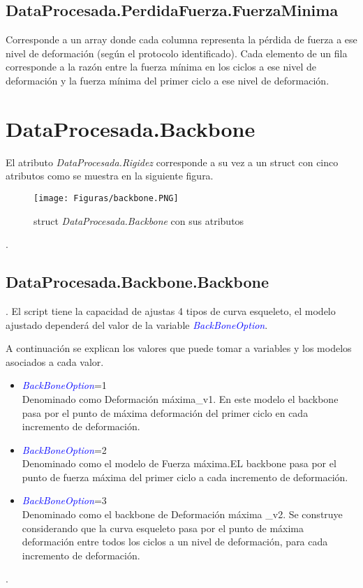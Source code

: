\documentclass[a4paper, 11pt,article,oneside]{memoir}%
\begin{document}
\section{DataProcesada.PerdidaFuerza.FuerzaMinima}
Corresponde a un array donde cada columna representa la pérdida de fuerza a ese nivel de deformación (según el protocolo identificado). Cada elemento de un fila corresponde a la razón entre la fuerza mínima en los ciclos a ese nivel de deformación y la fuerza mínima del primer ciclo a ese nivel de deformación.
\newpage
\chapter{DataProcesada.Backbone}
El atributo \textit{DataProcesada.Rigidez} corresponde a su vez a un struct con cinco atributos como se muestra en la siguiente figura.\par
\begin{figure}[h!]
    \centering
    \texttt{[image: Figuras/backbone.PNG]}
    \caption{struct \textit{DataProcesada.Backbone} con sus atributos}
    \label{fig:first resumen e6 }
\end{figure}.
\section{DataProcesada.Backbone.Backbone}.
El script tiene la capacidad de ajustas 4 tipos de curva esqueleto, el modelo ajustado dependerá del valor de la variable \textit{\textcolor{blue}{BackBoneOption}}.\par 
A continuación se explican los valores que puede tomar a variables y los modelos asociados a cada valor.
\begin{itemize}
\item \textit{\textcolor{blue}{BackBoneOption}}=1\\
Denominado como Deformación máxima\_v1. En este modelo el backbone pasa por el punto de máxima deformación del primer ciclo  en cada incremento de deformación.
\item \textit{\textcolor{blue}{BackBoneOption}}=2\\
Denominado como el modelo de Fuerza máxima.EL backbone  pasa por el punto de fuerza máxima del primer ciclo a cada incremento de deformación.
\item \textit{\textcolor{blue}{BackBoneOption}}=3\\
Denominado como el backbone de Deformación máxima \_v2. Se construye considerando que la curva esqueleto pasa por el punto de máxima deformación entre todos los ciclos a un nivel de deformación, para cada incremento de deformación.
\end{itemize}.
\end{document}
